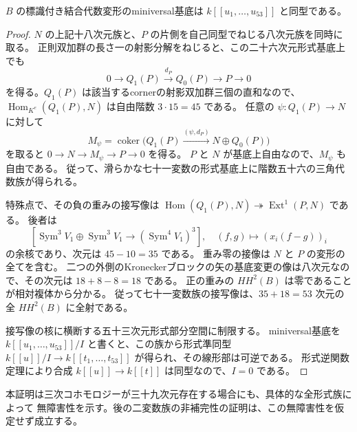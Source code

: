 \begin{theorem}\label{thm:vk-smooth53-v31}
$B$ の標識付き結合代数変形のminiversal基底は
$k[[u_1,\ldots,u_{53}]]$ と同型である。
\end{theorem}
\begin{proof}
$N$ の上記十八次元族と、$P$ の片側を自己同型でねじる八次元族を同時に取る。
正則双加群の長さ一の射影分解をねじると、この二十六次元形式基底上でも
\[
 0\longrightarrow Q_1(P)\xrightarrow{d_P}Q_0(P)\longrightarrow P\longrightarrow0
\]
を得る。$Q_1(P)$ は該当するcornerの射影双加群三個の直和なので、
$\operatorname{Hom}_{K^e}(Q_1(P),N)$ は自由階数 $3\cdot15=45$ である。
任意の $\psi:Q_1(P)\to N$ に対して
\[
 M_\psi=\operatorname{coker}\bigl(Q_1(P)\xrightarrow{(\psi,d_P)}N\oplus Q_0(P)\bigr)
\]
を取ると $0\to N\to M_\psi\to P\to0$ を得る。
$P$ と $N$ が基底上自由なので、$M_\psi$ も自由である。
従って、滑らかな七十一変数の形式基底上に階数五十六の三角代数族が得られる。

特殊点で、その負の重みの接写像は
$\operatorname{Hom}(Q_1(P),N)\twoheadrightarrow\operatorname{Ext}^1(P,N)$ である。
後者は
\[
 [\operatorname{Sym}^3V_1\oplus\operatorname{Sym}^3V_1
 \longrightarrow(\operatorname{Sym}^4V_1)^3],\quad
 (f,g)\longmapsto(x_i(f-g))_i
\]
の余核であり、次元は $45-10=35$ である。
重み零の接像は $N$ と $P$ の変形の全てを含む。
二つの外側のKroneckerブロックの矢の基底変更の像は八次元なので、その次元は
$18+8-8=18$ である。
正の重みの $HH^2(B)$ は零であることが相対複体から分かる。
従って七十一変数族の接写像は、$35+18=53$ 次元の全 $HH^2(B)$ に全射である。

接写像の核に横断する五十三次元形式部分空間に制限する。
miniversal基底を $k[[u_1,\ldots,u_{53}]]/I$ と書くと、この族から形式準同型
$k[[u]]/I\to k[[t_1,\ldots,t_{53}]]$ が得られ、その線形部は可逆である。
形式逆関数定理により合成 $k[[u]]\to k[[t]]$ は同型なので、$I=0$ である。
\end{proof}

本証明は三次コホモロジーが三十九次元存在する場合にも、具体的な全形式族によって
無障害性を示す。後の二変数族の非補完性の証明は、この無障害性を仮定せず成立する。
